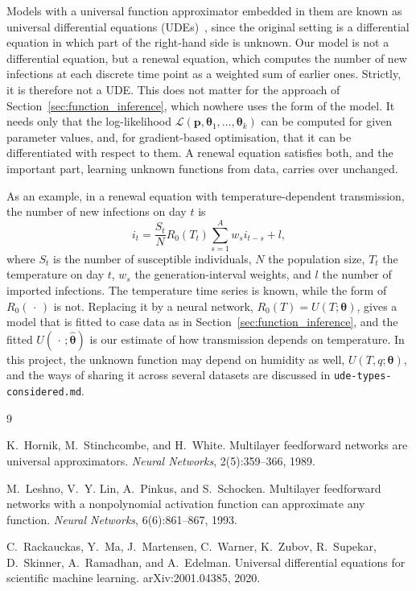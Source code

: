 \documentclass[11pt,a4paper]{article}
\renewcommand{\vec}[1]{\boldsymbol{#1}}
\begin{document}
Models with a universal function approximator embedded in them are known as universal differential equations (UDEs)~\cite{rackauckas2020universal}, since the original setting is a differential equation in which part of the right-hand side is unknown. Our model is not a differential equation, but a renewal equation, which computes the number of new infections at each discrete time point as a weighted sum of earlier ones. Strictly, it is therefore not a UDE. This does not matter for the approach of Section~\ref{sec:function_inference}, which nowhere uses the form of the model. It needs only that the log-likelihood $\mathcal{L}(\vec{p}, \vec{\theta}_1, \ldots, \vec{\theta}_k)$ can be computed for given parameter values, and, for gradient-based optimisation, that it can be differentiated with respect to them. A renewal equation satisfies both, and the important part, learning unknown functions from data, carries over unchanged.

As an example, in a renewal equation with temperature-dependent transmission, the number of new infections on day $t$ is
\begin{equation*}
    i_t = \frac{S_t}{N} R_0(T_t) \sum_{s = 1}^{A} w_s i_{t-s} + l,
\end{equation*}
where $S_t$ is the number of susceptible individuals, $N$ the population size, $T_t$ the temperature on day $t$, $w_s$ the generation-interval weights, and $l$ the number of imported infections. The temperature time series is known, while the form of $R_0(\,\cdot\,)$ is not. Replacing it by a neural network, $R_0(T) = U(T;\vec{\theta})$, gives a model that is fitted to case data as in Section~\ref{sec:function_inference}, and the fitted $U(\,\cdot\,;\hat{\vec{\theta}})$ is our estimate of how transmission depends on temperature. In this project, the unknown function may depend on humidity as well, $U(T, q;\vec{\theta})$, and the ways of sharing it across several datasets are discussed in \texttt{ude-types-considered.md}.

\begin{thebibliography}{9}

K.~Hornik, M.~Stinchcombe, and H.~White.
\newblock Multilayer feedforward networks are universal approximators.
\newblock \emph{Neural Networks}, 2(5):359--366, 1989.

M.~Leshno, V.~Y. Lin, A.~Pinkus, and S.~Schocken.
\newblock Multilayer feedforward networks with a nonpolynomial activation function can approximate any function.
\newblock \emph{Neural Networks}, 6(6):861--867, 1993.

C.~Rackauckas, Y.~Ma, J.~Martensen, C.~Warner, K.~Zubov, R.~Supekar, D.~Skinner, A.~Ramadhan, and A.~Edelman.
\newblock Universal differential equations for scientific machine learning.
\newblock arXiv:2001.04385, 2020.

\end{thebibliography}
\end{document}
